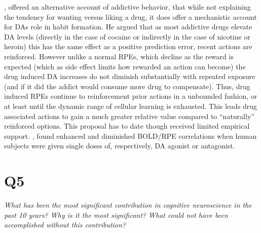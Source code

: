 \documentclass[doc]{apa}        %
\begin{document}
, offered an alternative account of addictive behavior, that while not explaining the tendency for wanting versus liking a drug, it does offer a mechanistic account for DAs role in habit formation.  He argued that as most addictive drugs elevate DA levels (directly in the case of cocaine or indirectly in the case of nicotine or heroin) this has the same effect as a positive prediction error, recent actions are reinforced. However unlike a normal RPEs, which decline as the reward is expected (which as side effect limits how rewarded an action can become) the drug induced DA increases do not diminish substantially with repeated exposure (and if it did the addict would consume more drug to compensate).  Thus, drug induced RPEs continue to reinforcement prior actions in a unbounded fashion, or at least until the dynamic range of cellular learning is exhausted.  This leads drug associated actions to gain a much greater relative value compared to ``naturally'' reinforced options.  This proposal has to date though received limited empirical support.  , found enhanced and diminished BOLD/RPE correlations when human subjects were given single doses of, respectively, DA agonist or antagonist.

\newpage
\section{Q5} %
\label{sec:q5}
\emph{What has been the most significant contribution in cognitive neuroscience in the past 10 years?  Why is it the most significant?  What could not have been accomplished without this contribution?}
\end{document}
